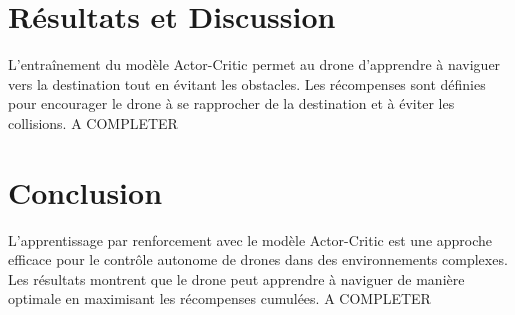 \documentclass[a4paper, 12pt]{article}
\begin{document}
\section{Résultats et Discussion}
L'entraînement du modèle Actor-Critic permet au drone d'apprendre à naviguer vers la destination tout en évitant les obstacles. Les récompenses sont définies pour encourager le drone à se rapprocher de la destination et à éviter les collisions.
A COMPLETER
\section{Conclusion}
L'apprentissage par renforcement avec le modèle Actor-Critic est une approche efficace pour le contrôle autonome de drones dans des environnements complexes. Les résultats montrent que le drone peut apprendre à naviguer de manière optimale en maximisant les récompenses cumulées.
A COMPLETER
\end{document}
